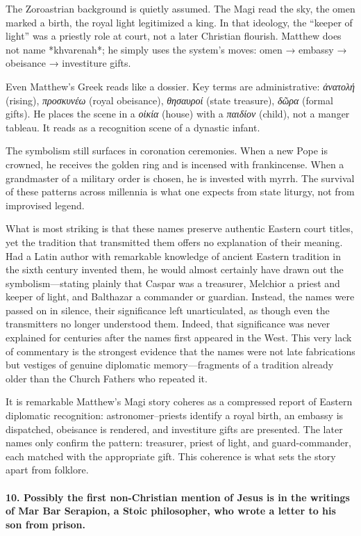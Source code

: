 The Zoroastrian background is quietly assumed.
The Magi read the sky, the omen marked a birth, the royal light legitimized a king.
In that ideology, the “keeper of light” was a priestly role at court, not a later Christian flourish.
Matthew does not name *khvarenah*; he simply uses the system’s moves: omen → embassy → obeisance → investiture gifts.

Even Matthew’s Greek reads like a dossier.
Key terms are administrative: \textit{ἀνατολή} (rising), \textit{προσκυνέω} (royal obeisance), \textit{θησαυροί} (state treasure), \textit{δῶρα} (formal gifts).
He places the scene in a \textit{οἰκία} (house) with a \textit{παιδίον} (child), not a manger tableau.
It reads as a recognition scene of a dynastic infant.

The symbolism still surfaces in coronation ceremonies.
When a new Pope is crowned, he receives the golden ring and is incensed with frankincense.
When a grandmaster of a military order is chosen, he is invested with myrrh.
The survival of these patterns across millennia is what one expects from state liturgy, not from improvised legend.

What is most striking is that these names preserve authentic Eastern court titles, yet the tradition that transmitted them offers no explanation of their meaning.
Had a Latin author with remarkable knowledge of ancient Eastern tradition in the sixth century invented them, he would almost certainly have drawn out the symbolism—stating plainly that Caspar was a treasurer, Melchior a priest and keeper of light, and Balthazar a commander or guardian.
Instead, the names were passed on in silence, their significance left unarticulated, as though even the transmitters no longer understood them.
Indeed, that significance was never explained for centuries after the names first appeared in the West.
This very lack of commentary is the strongest evidence that the names were not late fabrications but vestiges of genuine diplomatic memory—fragments of a tradition already older than the Church Fathers who repeated it.

It is remarkable Matthew’s Magi story coheres as a compressed report of Eastern diplomatic recognition: astronomer–priests identify a royal birth, an embassy is dispatched, obeisance is rendered, and investiture gifts are presented.
The later names only confirm the pattern: treasurer, priest of light, and guard-commander, each matched with the appropriate gift.
This coherence is what sets the story apart from folklore.

\paragraph{10.
Possibly the first non-Christian mention of Jesus is in the writings of Mar Bar Serapion, a Stoic philosopher, who wrote a letter to his son from prison.}\label{par:possibly-the-first-non-christian-mention-of-jesus-is-in-the-writings-of-mar-bar-serapion-a-stoic-philosopher-who-wrote-a-letter-to-his-son-from-prison.}

